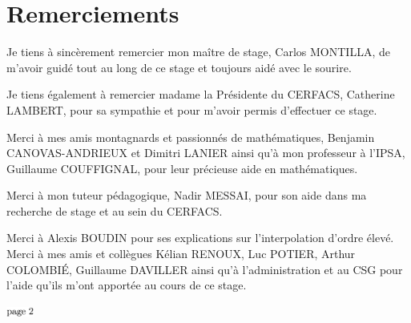 \chapter*{Remerciements}

Je tiens à sincèrement remercier mon maître de stage, Carlos MONTILLA, de m'avoir guidé tout au long de ce stage et toujours aidé avec le sourire.

\vspace{0.5cm}

Je tiens également à remercier madame la Présidente du CERFACS, Catherine LAMBERT, pour sa sympathie et pour m'avoir permis d'effectuer ce stage. %

Merci à mes amis montagnards et passionnés de mathématiques, Benjamin CANOVAS-ANDRIEUX et Dimitri \mbox{LANIER} ainsi qu'à mon professeur à l'IPSA, Guillaume COUFFIGNAL, pour leur précieuse aide en mathématiques.

Merci à mon tuteur pédagogique, Nadir MESSAI, pour son aide dans ma recherche de stage et au sein du CERFACS.

Merci à Alexis BOUDIN pour ses explications sur l'interpolation d'ordre élevé.
Merci à mes amis et collègues Kélian RENOUX, Luc POTIER, Arthur COLOMBIÉ, Guillaume DAVILLER ainsi qu'à l'administration et au CSG pour l'aide qu'ils m'ont apportée au cours de ce stage.




\vspace*{\fill} %
\begin{center}
    \includegraphics[width=0.067\textwidth]{images/page_2.png}
\end{center}
\vspace*{-13.5cm} %
\vspace*{\fill} %

